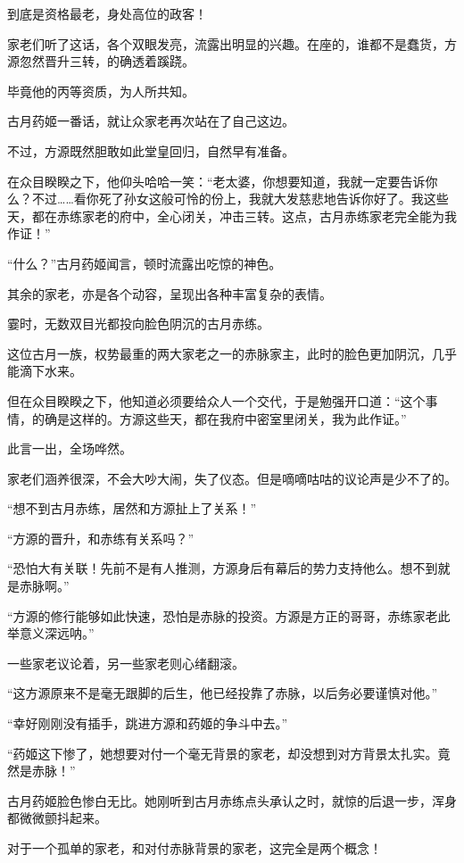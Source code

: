 \begin{this_body}
到底是资格最老，身处高位的政客！

家老们听了这话，各个双眼发亮，流露出明显的兴趣。在座的，谁都不是蠢货，方源忽然晋升三转，的确透着蹊跷。

毕竟他的丙等资质，为人所共知。

古月药姬一番话，就让众家老再次站在了自己这边。

不过，方源既然胆敢如此堂皇回归，自然早有准备。

在众目睽睽之下，他仰头哈哈一笑：“老太婆，你想要知道，我就一定要告诉你么？不过……看你死了孙女这般可怜的份上，我就大发慈悲地告诉你好了。我这些天，都在赤练家老的府中，全心闭关，冲击三转。这点，古月赤练家老完全能为我作证！”

“什么？”古月药姬闻言，顿时流露出吃惊的神色。

其余的家老，亦是各个动容，呈现出各种丰富复杂的表情。

霎时，无数双目光都投向脸色阴沉的古月赤练。

这位古月一族，权势最重的两大家老之一的赤脉家主，此时的脸色更加阴沉，几乎能滴下水来。

但在众目睽睽之下，他知道必须要给众人一个交代，于是勉强开口道：“这个事情，的确是这样的。方源这些天，都在我府中密室里闭关，我为此作证。”

此言一出，全场哗然。

家老们涵养很深，不会大吵大闹，失了仪态。但是嘀嘀咕咕的议论声是少不了的。

“想不到古月赤练，居然和方源扯上了关系！”

“方源的晋升，和赤练有关系吗？”

“恐怕大有关联！先前不是有人推测，方源身后有幕后的势力支持他么。想不到就是赤脉啊。”

“方源的修行能够如此快速，恐怕是赤脉的投资。方源是方正的哥哥，赤练家老此举意义深远呐。”

一些家老议论着，另一些家老则心绪翻滚。

“这方源原来不是毫无跟脚的后生，他已经投靠了赤脉，以后务必要谨慎对他。”

“幸好刚刚没有插手，跳进方源和药姬的争斗中去。”

“药姬这下惨了，她想要对付一个毫无背景的家老，却没想到对方背景太扎实。竟然是赤脉！”

古月药姬脸色惨白无比。她刚听到古月赤练点头承认之时，就惊的后退一步，浑身都微微颤抖起来。

对于一个孤单的家老，和对付赤脉背景的家老，这完全是两个概念！

\end{this_body}


